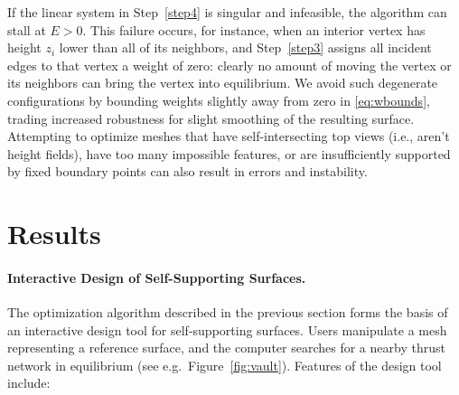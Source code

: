 \documentclass[review]{acmsiggraph}
\begin{document}
If the linear system in Step~\ref{step4} is singular and infeasible, the
algorithm can stall at $E > 0$. This failure occurs, for instance, when an
interior vertex has height $z_i$ lower than all of its neighbors, and
Step~\ref{step3} assigns all incident edges to that vertex a weight of
zero: clearly no amount of moving the vertex or its neighbors can bring
the vertex into equilibrium. We avoid such degenerate configurations by
bounding weights slightly away from zero in \eqref{eq:wbounds}, trading
increased robustness for slight smoothing of the resulting surface. Attempting
to optimize meshes that have self-intersecting top views (i.e., aren't height fields),
have too many impossible features, or are insufficiently supported by fixed
boundary points can also result in errors and instability.



\section{Results}
\label{sec:design}

\paragraph{Interactive Design of Self-Supporting Surfaces.}

The optimization algorithm described in the previous section forms the
basis of an interactive design tool for self-supporting surfaces. Users
manipulate a mesh representing a reference surface, and the computer
searches for a nearby thrust network in equilibrium (see e.g.\
Figure~\ref{fig:vault}). Features of the design tool include:
\end{document}
